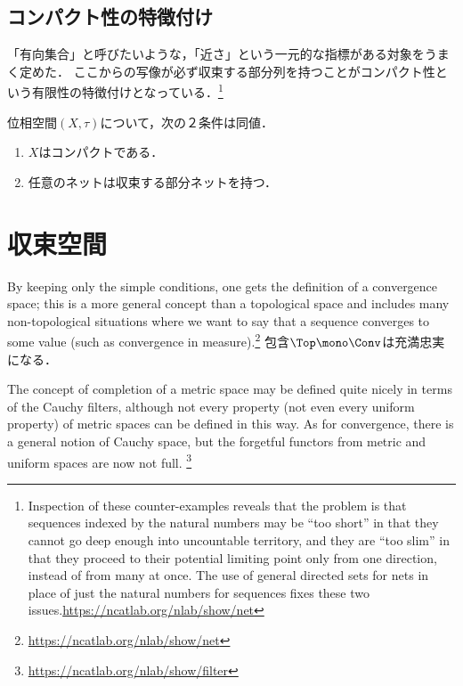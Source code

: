 \documentclass[uplatex,dvipdfmx]{jsreport}
\begin{document}
\subsection{コンパクト性の特徴付け}

\begin{tcolorbox}[colframe=ForestGreen, colback=ForestGreen!10!white,breakable,colbacktitle=ForestGreen!40!white,coltitle=black,fonttitle=\bfseries\sffamily,
title=]
    「有向集合」と呼びたいような，「近さ」という一元的な指標がある対象をうまく定めた．
    ここからの写像が必ず収束する部分列を持つことがコンパクト性という有限性の特徴付けとなっている．\footnote{Inspection of these counter-examples reveals that the problem is that sequences indexed by the natural numbers may be “too short” in that they cannot go deep enough into uncountable territory, and they are “too slim” in that they proceed to their potential limiting point only from one direction, instead of from many at once. The use of general directed sets for nets in place of just the natural numbers for sequences fixes these two issues.\url{https://ncatlab.org/nlab/show/net}}
\end{tcolorbox}

\begin{proposition}[AC, EM]
    位相空間$(X,\tau)$について，次の２条件は同値．
    \begin{enumerate}
        \item $X$はコンパクトである．
        \item 任意のネットは収束する部分ネットを持つ．
    \end{enumerate}
\end{proposition}

\section{収束空間}

\begin{tcolorbox}[colframe=ForestGreen, colback=ForestGreen!10!white,breakable,colbacktitle=ForestGreen!40!white,coltitle=black,fonttitle=\bfseries\sffamily,
title=]
    By keeping only the simple conditions, one gets the definition of a convergence space; this is a more general concept than a topological space and includes many non-topological situations where we want to say that a sequence converges to some value (such as convergence in measure).\footnote{\url{https://ncatlab.org/nlab/show/net}}
    包含$\Top\mono\Conv$は充満忠実になる．

    The concept of completion of a metric space may be defined quite nicely in terms of the Cauchy filters, although not every property (not even every uniform property) of metric spaces can be defined in this way. As for convergence, there is a general notion of Cauchy space, but the forgetful functors from metric and uniform spaces are now not full.
    \footnote{\url{https://ncatlab.org/nlab/show/filter}}
\end{tcolorbox}
\end{document}
